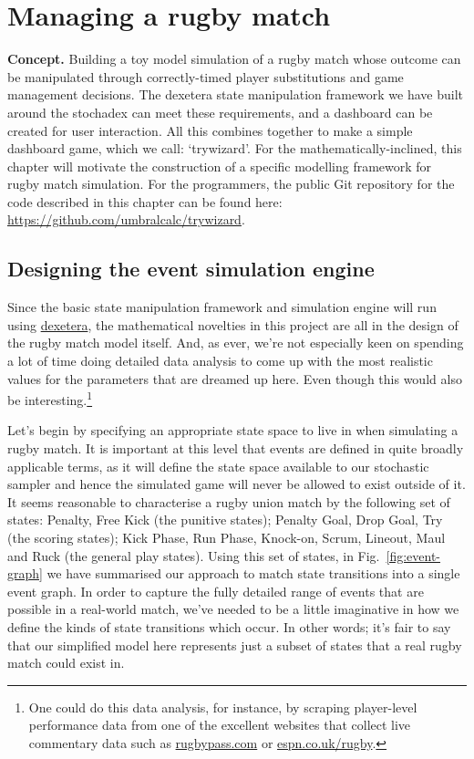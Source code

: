 \chapter{\sffamily Managing a rugby match}

{\bfseries\sffamily Concept.} Building a toy model simulation of a rugby match whose outcome can be manipulated through correctly-timed player substitutions and game management decisions. The dexetera state manipulation framework we have built around the stochadex can meet these requirements, and a dashboard can be created for user interaction. All this combines together to make a simple dashboard game, which we call: `trywizard'. For the mathematically-inclined, this chapter will motivate the construction of a specific modelling framework for rugby match simulation. For the programmers, the public Git repository for the code described in this chapter can be found here: \href{https://github.com/umbralcalc/trywizard}{https://github.com/umbralcalc/trywizard}.

\section{\sffamily Designing the event simulation engine}

Since the basic state manipulation framework and simulation engine will run using \href{https://github.com/umbralcalc/dexetera}{dexetera}, the mathematical novelties in this project are all in the design of the rugby match model itself. And, as ever, we're not especially keen on spending a lot of time doing detailed data analysis to come up with the most realistic values for the parameters that are dreamed up here. Even though this would also be interesting.\footnote{One could do this data analysis, for instance, by scraping player-level performance data from one of the excellent websites that collect live commentary data such as \href{https://www.rugbypass.com/}{rugbypass.com} or \href{https://www.espn.co.uk/rugby/}{espn.co.uk/rugby}.}

Let's begin by specifying an appropriate state space to live in when simulating a rugby match. It is important at this level that events are defined in quite broadly applicable terms, as it will define the state space available to our stochastic sampler and hence the simulated game will never be allowed to exist outside of it. It seems reasonable to characterise a rugby union match by the following set of states: {\sf Penalty}, {\sf Free Kick} (the punitive states); {\sf Penalty Goal}, {\sf Drop Goal}, {\sf Try} (the scoring states); {\sf Kick Phase}, {\sf Run Phase}, {\sf Knock-on}, {\sf Scrum}, {\sf Lineout}, {\sf Maul} and {\sf Ruck} (the general play states). Using this set of states, in Fig.~\ref{fig:event-graph} we have summarised our approach to match state transitions into a single event graph. In order to capture the fully detailed range of events that are possible in a real-world match, we've needed to be a little imaginative in how we define the kinds of state transitions which occur. In other words; it's fair to say that our simplified model here represents just a subset of states that a real rugby match could exist in.

